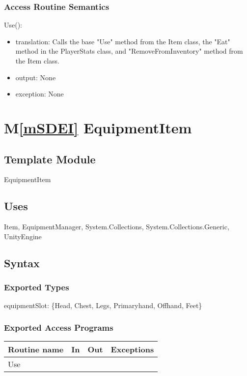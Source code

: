 \documentclass[12pt]{article}
\newcommand{\mref}[1]{M\ref{#1}}
\begin{document}
\subsubsection* {Access Routine Semantics}

\noindent Use():
\begin{itemize}
\item translation: Calls the base "Use" method from the Item class, the "Eat" method in the PlayerStats class, and "RemoveFromInventory" method from the Item class.
\item output: None
\item exception: None
\end{itemize}

\newpage

\section* {\mref{mSDEI} EquipmentItem}

\subsection*{Template Module}

EquipmentItem

\subsection* {Uses}

Item, EquipmentManager, System.Collections, System.Collections.Generic, UnityEngine

\subsection* {Syntax}

\subsubsection* {Exported Types}

equipmentSlot: \{Head, Chest, Legs, Primaryhand, Offhand, Feet\}

\subsubsection* {Exported Access Programs}

\begin{tabular}{| l | l | l | l |}
\hline
\textbf{Routine name} & \textbf{In} & \textbf{Out} & \textbf{Exceptions}\\
\hline
Use & ~ & ~ & ~\\
\hline
\end{tabular}
\end{document}
